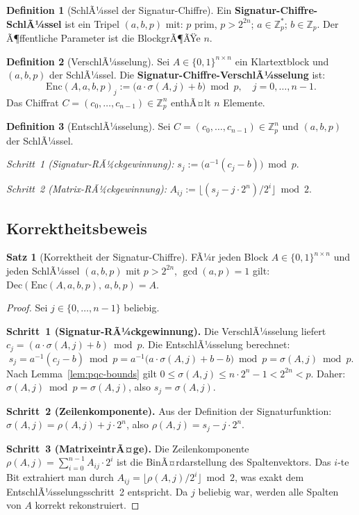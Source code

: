 ﻿\documentclass[a4paper,12pt]{article}
\theoremstyle{definition}
\newtheorem{definition}{Definition}[section]
\newtheorem{satz}{Satz}[section]
\begin{document}
\begin{definition}[SchlÃ¼ssel der Signatur-Chiffre]
Ein \textbf{Signatur-Chiffre-SchlÃ¼ssel} ist ein Tripel $(a, b, p)$ mit:
$p$ prim, $p > 2^{2n}$; $a \in \mathbb{Z}_p^*$; $b \in \mathbb{Z}_p$.
Der Ã¶ffentliche Parameter ist die BlockgrÃ¶ÃŸe $n$.
\end{definition}

\begin{definition}[VerschlÃ¼sselung]
\label{def:pqc-enc}
Sei $A \in \{0,1\}^{n \times n}$ ein Klartextblock und $(a, b, p)$ der SchlÃ¼ssel.
Die \textbf{Signatur-Chiffre-VerschlÃ¼sselung} ist:
\[
  \mathrm{Enc}(A, a, b, p)_j := \bigl(a \cdot \sigma(A,j) + b\bigr) \bmod p,
  \quad j = 0, \ldots, n-1.
\]
Das Chiffrat $C = (c_0,\ldots,c_{n-1}) \in \mathbb{Z}_p^n$ enthÃ¤lt $n$ Elemente.
\end{definition}

\begin{definition}[EntschlÃ¼sselung]
\label{def:pqc-dec}
Sei $C = (c_0,\ldots,c_{n-1}) \in \mathbb{Z}_p^n$ und $(a, b, p)$ der SchlÃ¼ssel.

\emph{Schritt~1 (Signatur-RÃ¼ckgewinnung):} $s_j := \bigl(a^{-1}(c_j - b)\bigr) \bmod p$.

\emph{Schritt~2 (Matrix-RÃ¼ckgewinnung):} $A_{ij} := \bigl\lfloor (s_j - j \cdot 2^n) / 2^i \bigr\rfloor \bmod 2$.
\end{definition}

\subsection{Korrektheitsbeweis}

\begin{satz}[Korrektheit der Signatur-Chiffre]
\label{satz:pqc-korrekt}
FÃ¼r jeden Block $A \in \{0,1\}^{n \times n}$ und jeden SchlÃ¼ssel $(a,b,p)$
mit $p > 2^{2n}$, $\gcd(a,p) = 1$ gilt:
$\mathrm{Dec}(\mathrm{Enc}(A, a, b, p),\, a, b, p) = A.$
\end{satz}

\begin{proof}
Sei $j \in \{0,\ldots,n-1\}$ beliebig.

\textbf{Schritt~1 (Signatur-RÃ¼ckgewinnung).}
Die VerschlÃ¼sselung liefert $c_j = (a \cdot \sigma(A,j) + b) \bmod p$.
Die EntschlÃ¼sselung berechnet:
\[
  s_j = a^{-1}(c_j - b) \bmod p
      = a^{-1}\bigl(a \cdot \sigma(A,j) + b - b\bigr) \bmod p
      = \sigma(A,j) \bmod p.
\]
Nach Lemma~\ref{lem:pqc-bounds} gilt $0 \leq \sigma(A,j) \leq n \cdot 2^n - 1 < 2^{2n} < p$.
Daher: $\sigma(A,j) \bmod p = \sigma(A,j)$, also $s_j = \sigma(A,j)$.

\textbf{Schritt~2 (Zeilenkomponente).}
Aus der Definition der Signaturfunktion: $\sigma(A,j) = \rho(A,j) + j \cdot 2^n$,
also $\rho(A,j) = s_j - j \cdot 2^n$.

\textbf{Schritt~3 (MatrixeintrÃ¤ge).}
Die Zeilenkomponente $\rho(A,j) = \sum_{i=0}^{n-1} A_{ij} \cdot 2^i$ ist die
BinÃ¤rdarstellung des Spaltenvektors. Das $i$-te Bit extrahiert man durch
$A_{ij} = \lfloor \rho(A,j) / 2^i \rfloor \bmod 2$, was exakt dem
EntschlÃ¼sselungsschritt~2 entspricht.
Da $j$ beliebig war, werden alle Spalten von $A$ korrekt rekonstruiert.
\end{proof}
\end{document}
